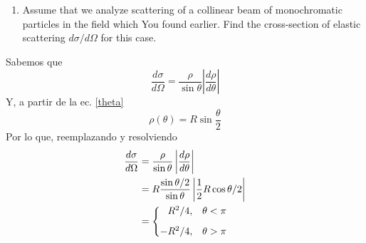 \documentclass[]{article}
\numberwithin{equation}{section}
\newcommand{\0}{\textcolor{gray}{0}}
\newcommand{\td}[2]{\dfrac{d #1}{d #2}}
\begin{document}

\begin{enumerate}
	\item[\textbf{c.}] Assume that we analyze scattering of a collinear beam of monochromatic particles in the field which You found earlier. Find the cross-section of elastic scattering \(d\sigma/d\Omega\) for this case.
\end{enumerate}
Sabemos que
\begin{equation}
	\td{\sigma}{\Omega} = \frac{\rho}{\sin\theta}\left|\td{\rho}{\theta}\right|
\end{equation}
Y, a partir de la ec. \ref{theta}
\begin{equation}
	\rho(\theta) = R \sin\frac{\theta}{2}
\end{equation}
Por lo que, reemplazando y resolviendo
\begin{align}
	\td{\sigma}{\Omega} &= \frac{\rho}{\sin\theta}\left|\td{\rho}{\theta}\right|\nonumber\\
	&= R \frac{\sin\theta/2}{\sin\theta} \left|\frac{1}{2} R \cos\theta/2\right| \nonumber\\
	&= \left\lbrace \begin{matrix}
		\hfill{R^2}/{4},	& \theta < \pi \vspace{3mm}\\
		-{R^2}/{4}, 		& \theta > \pi
	\end{matrix}\right.
\end{align}
\end{document}
